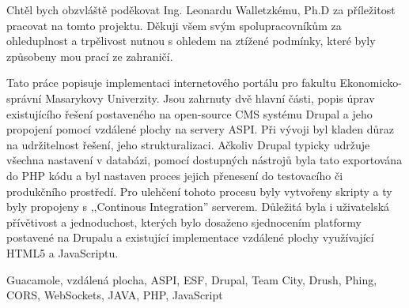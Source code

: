 \documentclass[10pt,final,oneside]{fithesis2}
\begin{document}
\FrontMatter
\ThesisTitlePage

\begin{ThesisDeclaration}
  \DeclarationText
  \AdvisorName
\end{ThesisDeclaration}



\begin{ThesisThanks}
Chtěl bych obzvláště poděkovat Ing. Leonardu Walletzkému, Ph.D za příležitost pracovat na tomto projektu. Děkuji všem svým spolupracovníkům za ohleduplnost a trpělivost nutnou s ohledem na ztížené podmínky, které byly způsobeny mou prací ze zahraničí.
\end{ThesisThanks}

\begin{ThesisAbstract}
Tato práce popisuje implementaci internetového portálu pro fakultu Ekonomicko-správní Masarykovy Univerzity. Jsou zahrnuty dvě hlavní části, popis úprav existujícího řešení postaveného na open-source CMS systému Drupal a jeho propojení pomocí vzdálené plochy na servery ASPI. Při vývoji byl kladen důraz na udržitelnost řešení, jeho strukturalizaci. Ačkoliv Drupal typicky udržuje všechna nastavení v databázi, pomocí dostupných nástrojů byla tato exportována do PHP kódu a byl nastaven proces jejich přenesení do testovacího či produkčního prostředí. Pro ulehčení tohoto procesu byly vytvořeny skripty a ty byly propojeny s ,,Continous Integration'' serverem. Důležitá byla i uživatelská přívětivost a jednoduchost, kterých bylo dosaženo sjednocením platformy postavené na Drupalu a existující implementace vzdálené plochy využívající HTML5 a JavaScriptu.
\end{ThesisAbstract}

\begin{ThesisKeyWords}
Guacamole, vzdálená plocha, ASPI, ESF, Drupal, Team City, Drush, Phing, CORS, WebSockets, JAVA, PHP, JavaScript
\end{ThesisKeyWords}
\end{document}
